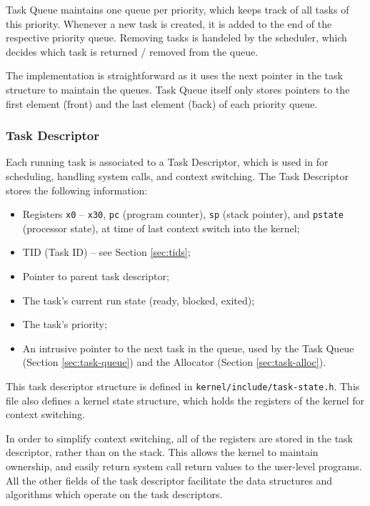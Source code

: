 \documentclass[12pt]{article}
\begin{document}
    Task Queue maintains one queue per priority, which keeps track of all tasks of this priority. 
    Whenever a new task is created, it is added to the end of the respective priority queue. 
    Removing tasks is handeled by the scheduler, which decides which task is returned / removed from the queue. 
    
    The implementation is straightforward as it uses the next pointer in the task structure to maintain the queues. 
    Task Queue itself only stores pointers to the first element (\= front) and the last element (\= back) of each priority queue.
    
    \subsubsection{Task Descriptor}
    
    Each running task is associated to a Task Descriptor, which is used in for scheduling, handling system calls, and context switching. The Task Descriptor stores the following information:
    \begin{itemize}
        \item Registers \verb`x0` -- \verb`x30`, \verb`pc` (program counter), \verb`sp` (stack pointer), and \verb`pstate` (processor state), at time of last context switch into the kernel;
        \item TID (Task ID) -- see Section \ref{sec:tids};
        \item Pointer to parent task descriptor;
        \item The task's current run state (ready, blocked, exited);
        \item The task's priority;
        \item An intrusive pointer to the next task in the queue, used by the Task Queue (Section \ref{sec:task-queue}) and the Allocator (Section \ref{sec:task-alloc}).
    \end{itemize}
    This task descriptor structure is defined in \verb`kernel/include/task-state.h`. This file also defines a kernel state structure, which holds the registers of the kernel for context switching.
    
    In order to simplify context switching, all of the registers are stored in the task descriptor, rather than on the stack. This allows the kernel to maintain ownership, and easily return system call return values to the user-level programs. All the other fields of the task descriptor facilitate the data structures and algorithms which operate on the task descriptors.
\end{document}
